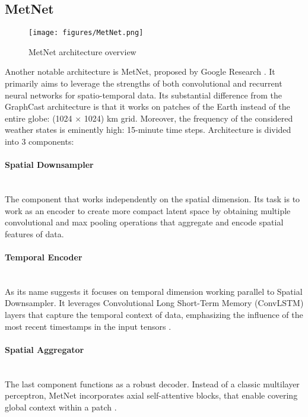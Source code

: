 \subsection{MetNet} \label{sec:metnet}
\begin{figure}
    \centering
    \texttt{[image: figures/MetNet.png]}
    \caption{MetNet architecture overview \cite{DBLP:journals/corr/abs-2003-12140}}
    \label{fig:metnet}
\end{figure}
Another notable architecture is MetNet, proposed by Google Research \cite{DBLP:journals/corr/abs-2003-12140}. It primarily aims to leverage the strengths of both convolutional and recurrent neural networks for spatio-temporal data. Its substantial difference from the GraphCast architecture is that it works on patches of the Earth instead of the entire globe: (1024 $\times$ 1024) km grid. Moreover, the frequency of the considered weather states is eminently high: 15-minute time steps. Architecture is divided into 3 components:

\paragraph{Spatial Downsampler} \mbox{} \\
\noindent The component that works independently on the spatial dimension. Its task is to work as an encoder to create more compact latent space by obtaining multiple convolutional and max pooling operations that aggregate and encode spatial features of data.

\paragraph{Temporal Encoder} \mbox{} \\
\noindent As its name suggests it focuses on temporal dimension working parallel to Spatial Downsampler. It leverages Convolutional Long Short-Term Memory (ConvLSTM) layers that capture the temporal context of data, emphasizing the influence of the most recent timestamps in the input tensors \cite{shi2015convolutional}. 

\paragraph{Spatial Aggregator} \mbox{} \\
\noindent The last component functions as a robust decoder. Instead of a classic multilayer perceptron, MetNet incorporates axial self-attentive blocks, that enable covering global context within a patch \cite{ho2019axial}.

